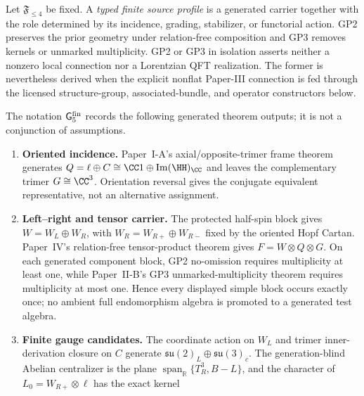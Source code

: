 \documentclass[12pt,a4paper]{article}
\begin{document}
\begin{definition}
\label{p5:def:primitive-finite-source-operator}
Let \(\mathfrak F_{\le4}\) be fixed.  A \emph{typed finite source profile} is
a generated carrier together with the role determined by its incidence,
grading, stabilizer, or functorial action.  GP2 preserves the prior geometry
under relation-free composition and GP3 removes kernels or unmarked
multiplicity.  GP2 or GP3 in isolation asserts neither a nonzero local
connection nor a Lorentzian QFT realization.  The former is nevertheless
derived when the explicit nonflat Paper-III connection is fed through the
licensed structure-group, associated-bundle, and operator constructors below.
\end{definition}

\begin{definition}
\label{p5:def:source-operation-envelope}
The notation \(\mathsf G_5^{\rm fin}\) records the following generated
theorem outputs; it is not a conjunction of assumptions.
\begin{enumerate}[label=(\roman*), leftmargin=2.2em]
\item \textbf{Oriented incidence.}  Paper~I-A's axial/opposite-trimer frame
      theorem generates
      \(Q=\ell\oplus C\cong\CC1\oplus\operatorname{Im}(\HH)_\CC\) and leaves
      the complementary trimer \(G\cong\CC^3\).  Orientation reversal gives
      the conjugate equivalent representative, not an alternative assignment.
\item \textbf{Left--right and tensor carrier.}  The protected half-spin block
      gives \(W=W_L\oplus W_R\), with
      \(W_R=W_{R+}\oplus W_{R-}\) fixed by the oriented Hopf Cartan.
      Paper~IV's relation-free tensor-product theorem gives
      \(F=W\otimes Q\otimes G\).  On each generated component block, GP2
      no-omission requires multiplicity at least one, while Paper~II-B's GP3
      unmarked-multiplicity theorem requires multiplicity at most one.
      Hence every displayed simple block occurs exactly once; no ambient full
      endomorphism algebra is promoted to a generated test algebra.
\item \textbf{Finite gauge candidates.}  The coordinate action on \(W_L\)
      and trimer inner-derivation closure on \(C\) generate
      \(\mathfrak{su}(2)_L\oplus\mathfrak{su}(3)_c\).  The generation-blind
      Abelian centralizer is the plane
      \(\operatorname{span}_{\mathbb R}\{T_R^3,B-L\}\), and the character of
      \(L_0=W_{R+}\otimes\ell\) has the exact kernel

\end{enumerate}
\end{definition}
\end{document}
